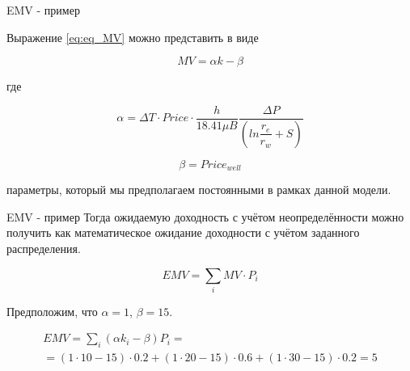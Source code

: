 \begin{frame}{EMV - пример}

Выражение \ref{eq:eq_MV} можно представить в виде

\begin{equation}
	MV = \alpha k - \beta
	\label{eq:eq_MV_2}
\end{equation}

где 

$$\alpha =  \Delta T \cdot  Price \cdot \frac{h}{18.41 \mu B} \frac{\Delta P}{  \left( ln\dfrac{r_e}{r_w} + S\right)}
$$ 

$$
\beta = Price_{well}
$$

параметры, который мы предполагаем постоянными в рамках данной модели. 
\end{frame}

\begin{frame}{EMV - пример}
Тогда ожидаемую доходность с учётом неопределённости можно получить как математическое ожидание доходности с учётом заданного распределения. 

\begin{equation}
	EMV = \sum_{i} MV \cdot P_i 
\end{equation}

Предположим, что  $\alpha = 1$, $\beta = 15$. 

\begin{multline}
	EMV = \sum_{i} (\alpha k_i - \beta ) P_i = \\
	= (1 \cdot 10 - 15) \cdot 0.2 + (1 \cdot 20 - 15)\cdot 0.6 + (1 \cdot 30 - 15)\cdot 0.2 = 5
\end{multline}



\end{frame}